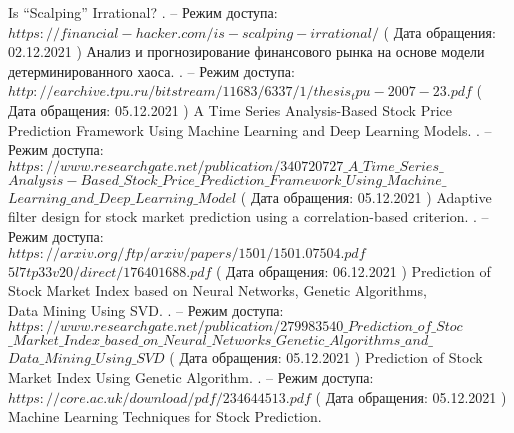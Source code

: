 \begin{thebibliography}{}
    \newblock Is “Scalping” Irrational?
    . – Режим доступа: \\
    \newblock $https://financial-hacker.com/is-scalping-irrational/$ ( Дата обращения: 02.12.2021 )
    \newblock Анализ и прогнозирование финансового рынка на основе модели детерминированного хаоса.
    . – Режим доступа: \\
    \newblock $http://earchive.tpu.ru/bitstream/11683/6337/1/thesis_tpu-2007-23.pdf$ ( Дата обращения: 05.12.2021 )
    \newblock A Time Series Analysis-Based Stock Price Prediction Framework Using Machine Learning and Deep Learning Models.
    . – Режим доступа: \\
    \newblock $https://www.researchgate.net/publication/340720727\_A\_Time\_Series\_$ \\
    \newblock $ Analysis-Based\_Stock\_Price\_Prediction\_Framework\_Using\_Machine\_$\\
    \newblock $Learning\_and\_Deep\_Learning\_Model$ ( Дата обращения: 05.12.2021 )
    \newblock Adaptive filter design for stock market prediction using a correlation-based criterion.
    . – Режим доступа: \\
    \newblock $https://arxiv.org/ftp/arxiv/papers/1501/1501.07504.pdf$ \\
    \newblock $5l7tp33v20/direct/176401688.pdf$ ( Дата обращения: 06.12.2021 )
    \newblock Prediction of Stock Market Index based on Neural Networks, Genetic Algorithms,\\
    \newblock Data Mining Using SVD.
    . – Режим доступа: \\
    \newblock $https://www.researchgate.net/publication/279983540\_Prediction\_of\_Stoc$ \\
    \newblock $\_Market\_Index\_based\_on\_Neural\_Networks\_Genetic\_Algorithms\_and\_$ \\ 
    \newblock $Data\_Mining\_Using\_SVD$ ( Дата обращения: 05.12.2021 )
    \newblock Prediction of Stock Market Index Using Genetic Algorithm.
    . – Режим доступа: \\
    \newblock $https://core.ac.uk/download/pdf/234644513.pdf$ ( Дата обращения: 05.12.2021 )
    \newblock Machine Learning Techniques for Stock Prediction.

\end{thebibliography}
